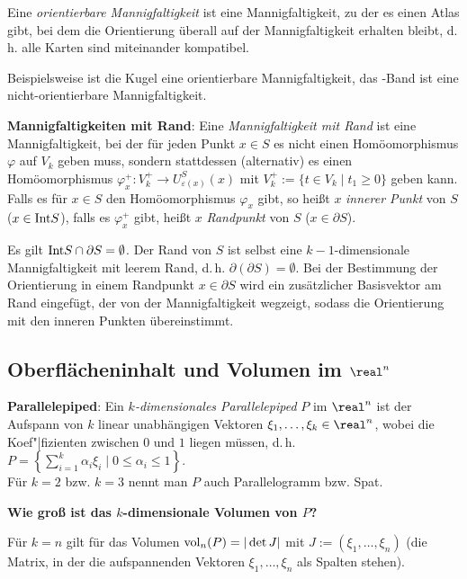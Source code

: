 Eine \emph{orientierbare Mannigfaltigkeit} ist eine Mannigfaltigkeit, zu der
es einen Atlas gibt, bei dem die Orientierung überall auf der Mannigfaltigkeit
erhalten bleibt, d.\,h. alle Karten sind miteinander kompatibel.

Beispielsweise ist die Kugel eine orientierbare Mannigfaltigkeit,
das -Band ist eine nicht-orientierbare Mannigfaltigkeit.

\linie

\textbf{Mannigfaltigkeiten mit Rand}:
Eine \emph{Mannigfaltigkeit mit Rand} ist eine Mannigfaltigkeit, bei der für
jeden Punkt $x \in S$ es nicht einen Homöomorphismus
$\varphi$ auf $V_k$ geben muss, sondern stattdessen (alternativ) es einen
Homöomorphismus
$\varphi_x^+\colon V_k^+ \rightarrow U_{\varepsilon(x)}^S(x)$ mit
$V_k^+ := \{t \in V_k \;|\; t_1 \ge 0\}$ geben kann.
Falls es für $x \in S$ den Homöomorphismus $\varphi_x$ gibt, so heißt
$x$ \emph{innerer Punkt} von $S$ ($x \in {\operatorname{Int}} S$), falls es $\varphi_x^+$ gibt,
heißt $x$ \emph{Randpunkt} von $S$ ($x \in \partial S$).

Es gilt ${\operatorname{Int}} S \cap \partial S = \emptyset$.
Der Rand von $S$ ist selbst eine $k - 1$-dimensionale Mannigfaltigkeit
mit leerem Rand, d.\,h. $\partial (\partial S) = \emptyset$.
Bei der Bestimmung der Orientierung in einem Randpunkt $x \in \partial S$ wird
ein zusätzlicher Basisvektor am Rand eingefügt, der von der Mannigfaltigkeit
wegzeigt, sodass die Orientierung mit den inneren Punkten übereinstimmt.

\pagebreak

\subsection{%
    \texorpdfstring{Oberflächeninhalt und Volumen im $\real^n$}%
    {Oberflächeninhalt und Volumen im ℝⁿ}%
}

\textbf{Parallelepiped}:
Ein \emph{$k$-dimensionales Parallelepiped} $P$ im $\real^n$ ist der Aufspann
von $k$ linear unabhängigen Vektoren $\xi_1, \dotsc, \xi_k \in \real^n$,
wobei die Koef"|fizienten zwischen $0$ und $1$ liegen müssen, d.\,h.
$P = \left\{\sum_{i=1}^k \alpha_i \xi_i \;|\; 0 \le \alpha_i \le 1\right\}$. \\
Für $k = 2$ bzw. $k = 3$ nennt man $P$ auch Parallelogramm bzw. Spat.

\linie

\textbf{Wie groß ist das $k$-dimensionale Volumen von $P$?}

Für $k = n$ gilt für das Volumen ${\operatorname{vol}}_n(P) = |\det J|$ mit
$J := (\xi_1, \dotsc, \xi_n)$
(die Matrix, in der die aufspannenden Vektoren $\xi_1, \dotsc, \xi_n$ als
Spalten stehen).

